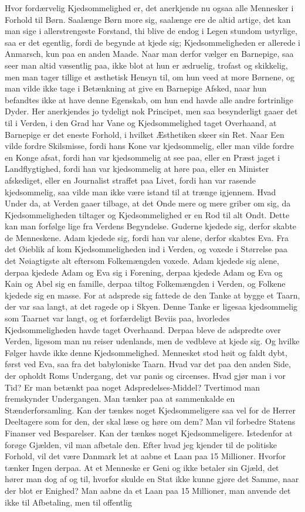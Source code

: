 \documentclass[12pt,a4paper]{article}
\begin{document}
Hvor fordærvelig Kjedsommelighed er, det anerkjende nu ogsaa alle Mennesker i Forhold til Børn. Saalænge Børn more sig, saalænge ere de altid artige, det kan man sige i allerstrengeste Forstand, thi blive de endog i Legen stundom ustyrlige, saa er det egentlig, fordi de begynde at kjede sig; Kjedsommeligheden er allerede i Anmarsch, kun paa en anden Maade. Naar man derfor vælger en Barnepige, saa seer man altid væsentlig paa, ikke blot at hun er ædruelig, trofast og skikkelig, men man tager tillige et æsthetisk Hensyn til, om hun veed at more Børnene, og man vilde ikke tage i Betænkning at give en Barnepige Afsked, naar hun befandtes ikke at have denne Egenskab, om hun end havde alle andre fortrinlige Dyder. Her anerkjendes jo tydeligt nok Principet, men saa besynderligt gaaer det til i Verden, i den Grad har Vane og Kjedsommelighed taget Overhaand, at Barnepige er det eneste Forhold, i hvilket Æsthetiken skeer sin Ret. Naar Een vilde fordre Skilsmisse, fordi hans Kone var kjedsommelig, eller man vilde fordre en Konge afsat, fordi han var kjedsommelig at see paa, eller en Præst jaget i Landflygtighed, fordi han var kjedsommelig at høre paa, eller en Minister afskediget, eller en Journalist straffet paa Livet, fordi han var rasende kjedsommelig, saa vilde man ikke være istand til at trænge igjennem. Hvad Under da, at Verden gaaer tilbage, at det Onde mere og mere griber om sig, da Kjedsommeligheden tiltager og Kjedsommelighed er en Rod til alt Ondt. Dette kan man forfølge lige fra Verdens Begyndelse. Guderne kjedede sig, derfor skabte de Menneskene. Adam kjedede sig, fordi han var alene, derfor skabtes Eva. Fra det Øieblik af kom Kjedsommeligheden ind i Verden, og voxede i Størrelse paa det Nøiagtigste alt eftersom Folkemængden voxede. Adam kjedede sig alene, derpaa kjedede Adam og Eva sig i Forening, derpaa kjedede Adam og Eva og Kain og Abel sig en famille, derpaa tiltog Folkemængden i Verden, og Folkene kjedede sig en masse. For at adsprede sig fattede de den Tanke at bygge et Taarn, der var saa langt, at det ragede op i Skyen. Denne Tanke er ligesaa kjedsommelig som Taarnet var langt, og et forfærdeligt Beviis paa, hvorledes Kjedsommeligheden havde taget Overhaand. Derpaa bleve de adspredte over Verden, ligesom man nu reiser udenlands, men de vedbleve at kjede sig. Og hvilke Følger havde ikke denne Kjedsommelighed. Mennesket stod høit og faldt dybt, først ved Eva, saa fra det babyloniske Taarn. Hvad var det paa den anden Side, der opholdt Roms Undergang, det var panis og circenses. Hvad gjør man i vor Tid? Er man betænkt paa noget Adspredelses-Middel? Tvertimod man fremskynder Undergangen. Man tænker paa at sammenkalde en Stænderforsamling. Kan der tænkes noget Kjedsommeligere saa vel for de Herrer Deeltagere som for den, der skal læse og høre om dem? Man vil forbedre Statens Finanser ved Besparelser. Kan der tænkes noget Kjedsommeligere. Istedenfor at forøge Gjælden, vil man afbetale den. Efter hvad jeg kjender til de politiske Forhold, vil det være Danmark let at aabne et Laan paa 15 Millioner. Hvorfor tænker Ingen derpaa. At et Menneske er Geni og ikke betaler sin Gjæld, det hører man dog af og til, hvorfor skulde en Stat ikke kunne gjøre det Samme, naar der blot er Enighed? Man aabne da et Laan paa 15 Millioner, man anvende det ikke til Afbetaling, men til offentlig 
\end{document}
